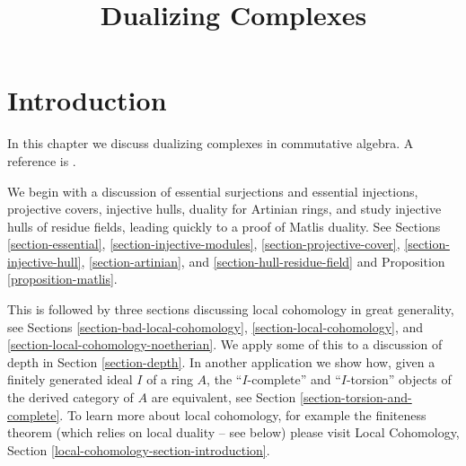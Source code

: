 

%


\title{Dualizing Complexes}


\maketitle

\label{section-phantom}

\tableofcontents

\section{Introduction}
\label{section-introduction}

\noindent
In this chapter we discuss dualizing complexes in commutative algebra.
A reference is \cite{RD}.

\medskip\noindent
We begin with a discussion of
essential surjections and essential injections,
projective covers,
injective hulls,
duality for Artinian rings, and
study injective hulls of residue fields,
leading quickly to a proof of Matlis duality.
See Sections \ref{section-essential},
\ref{section-injective-modules},
\ref{section-projective-cover},
\ref{section-injective-hull},
\ref{section-artinian}, and
\ref{section-hull-residue-field} and
Proposition \ref{proposition-matlis}.

\medskip\noindent
This is followed by three sections discussing local cohomology in
great generality, see Sections \ref{section-bad-local-cohomology},
\ref{section-local-cohomology}, and \ref{section-local-cohomology-noetherian}.
We apply some of this to a discussion of depth in
Section \ref{section-depth}. In another application we show how,
given a finitely generated ideal $I$ of a ring $A$, the
``$I$-complete'' and ``$I$-torsion'' objects
of the derived category of $A$ are equivalent, see
Section \ref{section-torsion-and-complete}.
To learn more about local cohomology, for example the finiteness
theorem (which relies on local duality -- see below) please visit
Local Cohomology, Section \ref{local-cohomology-section-introduction}.

